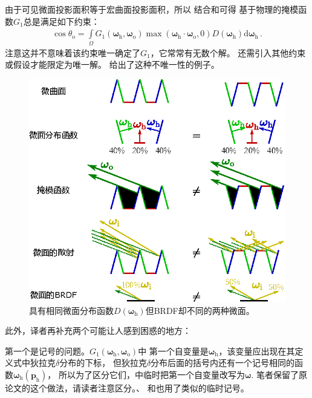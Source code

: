 由于可见微面投影面积等于宏曲面投影面积，所以
结合和可得
基于物理的掩模函数$G_1$总是满足如下约束：
\begin{align}\label{eq:08ex01-CosThetaO}
    \cos\theta_{\mathrm{o}}=\int\limits_{\varOmega}
    G_1({\bm\omega}_{\mathrm{h}},{\bm\omega}_{\mathrm{o}})
    \max({\bm\omega}_{\mathrm{h}}\cdot{\bm\omega}_{\mathrm{o}},0)
    D({\bm\omega}_{\mathrm{h}})\mathrm{d}{\bm\omega}_{\mathrm{h}}\, .
\end{align}
注意这并不意味着该约束唯一确定了$G_1$，它常常有无数个解。
还需引入其他约束或假设才能限定为唯一解。
给出了这种不唯一性的例子。
\begin{figure}[htbp]
    \centering
    \includegraphics[width=0.75\linewidth]{Pictures/chap08/SameDistributionOfNormalsDifferentBRDFs.eps}
    \caption{具有相同微面分布函数$D({\bm\omega}_{\mathrm{h}})$但BRDF却不同的两种微面。}
    \label{fig:08ex01-SameDistributionOfNormalsDifferentBRDFs}
\end{figure}

此外，译者再补充两个可能让人感到困惑的地方：

第一个是记号的问题。$G_1({\bm\omega}_{\mathrm{h}},{\bm\omega}_{\mathrm{o}})$中
第一个自变量是${\bm\omega}_{\mathrm{h}}$，该变量应出现在其定义式中狄拉克$\delta$分布的下标，
但狄拉克$\delta$分布后面的括号内还有一个记号相同的函数${\bm\omega}_{\mathrm{h}}({\bm p}_{\mathrm{h}})$，
所以为了区分它们，中临时把第一个自变量改写为${\bm\omega}$.
笔者保留了原论文的这个做法，请读者注意区分。、
和也用了类似的临时记号。

